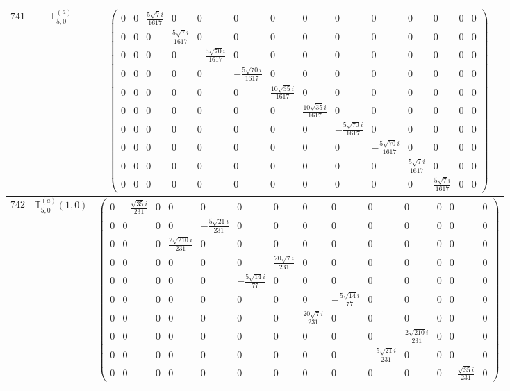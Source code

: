 \documentclass[fleqn,8pt,landscape]{jsarticle}
\begin{document}
\begin{center}
\begin{longtable}{ccc}
$ 741 $ & $ \mathbb{T}_{5,0}^{(a)} $ & $ \begin{pmatrix} 0 & 0 & \frac{5 \sqrt{7} i}{1617} & 0 & 0 & 0 & 0 & 0 & 0 & 0 & 0 & 0 & 0 & 0 \\ 0 & 0 & 0 & \frac{5 \sqrt{7} i}{1617} & 0 & 0 & 0 & 0 & 0 & 0 & 0 & 0 & 0 & 0 \\ 0 & 0 & 0 & 0 & - \frac{5 \sqrt{70} i}{1617} & 0 & 0 & 0 & 0 & 0 & 0 & 0 & 0 & 0 \\ 0 & 0 & 0 & 0 & 0 & - \frac{5 \sqrt{70} i}{1617} & 0 & 0 & 0 & 0 & 0 & 0 & 0 & 0 \\ 0 & 0 & 0 & 0 & 0 & 0 & \frac{10 \sqrt{35} i}{1617} & 0 & 0 & 0 & 0 & 0 & 0 & 0 \\ 0 & 0 & 0 & 0 & 0 & 0 & 0 & \frac{10 \sqrt{35} i}{1617} & 0 & 0 & 0 & 0 & 0 & 0 \\ 0 & 0 & 0 & 0 & 0 & 0 & 0 & 0 & - \frac{5 \sqrt{70} i}{1617} & 0 & 0 & 0 & 0 & 0 \\ 0 & 0 & 0 & 0 & 0 & 0 & 0 & 0 & 0 & - \frac{5 \sqrt{70} i}{1617} & 0 & 0 & 0 & 0 \\ 0 & 0 & 0 & 0 & 0 & 0 & 0 & 0 & 0 & 0 & \frac{5 \sqrt{7} i}{1617} & 0 & 0 & 0 \\ 0 & 0 & 0 & 0 & 0 & 0 & 0 & 0 & 0 & 0 & 0 & \frac{5 \sqrt{7} i}{1617} & 0 & 0 \end{pmatrix} $ \\ \hline
$ 742 $ & $ \mathbb{T}_{5,0}^{(a)}(1,0) $ & $ \begin{pmatrix} 0 & - \frac{\sqrt{35} i}{231} & 0 & 0 & 0 & 0 & 0 & 0 & 0 & 0 & 0 & 0 & 0 & 0 \\ 0 & 0 & 0 & 0 & - \frac{5 \sqrt{21} i}{231} & 0 & 0 & 0 & 0 & 0 & 0 & 0 & 0 & 0 \\ 0 & 0 & 0 & \frac{2 \sqrt{210} i}{231} & 0 & 0 & 0 & 0 & 0 & 0 & 0 & 0 & 0 & 0 \\ 0 & 0 & 0 & 0 & 0 & 0 & \frac{20 \sqrt{7} i}{231} & 0 & 0 & 0 & 0 & 0 & 0 & 0 \\ 0 & 0 & 0 & 0 & 0 & - \frac{5 \sqrt{14} i}{77} & 0 & 0 & 0 & 0 & 0 & 0 & 0 & 0 \\ 0 & 0 & 0 & 0 & 0 & 0 & 0 & 0 & - \frac{5 \sqrt{14} i}{77} & 0 & 0 & 0 & 0 & 0 \\ 0 & 0 & 0 & 0 & 0 & 0 & 0 & \frac{20 \sqrt{7} i}{231} & 0 & 0 & 0 & 0 & 0 & 0 \\ 0 & 0 & 0 & 0 & 0 & 0 & 0 & 0 & 0 & 0 & \frac{2 \sqrt{210} i}{231} & 0 & 0 & 0 \\ 0 & 0 & 0 & 0 & 0 & 0 & 0 & 0 & 0 & - \frac{5 \sqrt{21} i}{231} & 0 & 0 & 0 & 0 \\ 0 & 0 & 0 & 0 & 0 & 0 & 0 & 0 & 0 & 0 & 0 & 0 & - \frac{\sqrt{35} i}{231} & 0 \end{pmatrix} $ \\ \hline

\end{longtable}
\end{center}
\end{document}

